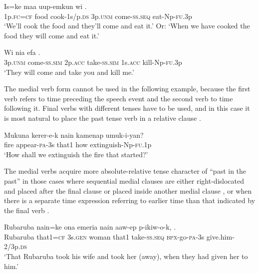 \ea%
\label{ex:3:x1026}
\gll Is=ke maa uup-emkun wi  . \\
1p.\textsc{fc}=\textsc{cf} food cook-1s/p.\textsc{ds} 3p.\textsc{unm} come-\textsc{ss}.\textsc{seq} eat-Np-\textsc{fu}.3p\\
\glt`We'll cook the food and they'll come and eat it.' Or: `When we have cooked the food they will come and eat it.'
\z

\ea%
\label{ex:3:x1027}
\gll Wi  nia  efa . \\
3p.\textsc{unm} come-\textsc{ss}.\textsc{sim} 2p.\textsc{acc} take-\textsc{ss}.\textsc{sim} 1s.\textsc{acc} kill-Np-\textsc{fu}.3p\\
\glt`They will come and take you and kill me.'
\z

The medial verb form cannot be used in the following example, because the first verb refers to time preceding the speech event and the second verb to time following it. Final verbs with different tenses have to be used, and in this case it is most natural to place the past tense verb in a relative clause . 

\ea%
\label{ex:3:x1030}
\gll Mukuna kerer-e-k nain kamenap umuk-i-yan? \\
fire appear-\textsc{pa}-3s that1 how extinguish-Np-\textsc{fu}.1p\\
\glt`How shall we extinguish the fire that started?'
\z

The medial verbs acquire more absolute-relative tense character of ``past in the past'' \citep[65]{Comrie1985} in those cases where sequential medial clauses are either right-dislo\-cated and placed after the final clause  or placed inside another medial clause , or when there is a separate time expression referring to earlier time than that indicated by the final verb . 

\ea%
\label{ex:3:x1031}
\gll Rubaruba nain=ke ona emeria nain aaw-ep p-ikiw-o-k, .\\
Rubaruba that1=\textsc{cf} 3s.\textsc{gen} woman that1 take-\textsc{ss}.\textsc{seq} \textsc{bpx}-go-\textsc{pa}-3s give.him-2/3p.\textsc{ds}\\
\glt`That Rubaruba took his wife and took her (away), when they had given her to him.'
\z

